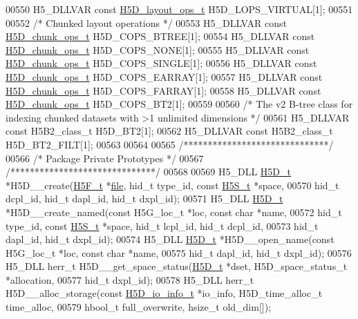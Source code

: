 \begin{DoxyCode}
00550 H5\_DLLVAR \textcolor{keyword}{const} \hyperlink{struct_h5_d__layout__ops__t}{H5D\_layout\_ops\_t} H5D\_LOPS\_VIRTUAL[1];
00551 
00552 \textcolor{comment}{/* Chunked layout operations */}
00553 H5\_DLLVAR \textcolor{keyword}{const} \hyperlink{struct_h5_d__chunk__ops__t}{H5D\_chunk\_ops\_t} H5D\_COPS\_BTREE[1];
00554 H5\_DLLVAR \textcolor{keyword}{const} \hyperlink{struct_h5_d__chunk__ops__t}{H5D\_chunk\_ops\_t} H5D\_COPS\_NONE[1];
00555 H5\_DLLVAR \textcolor{keyword}{const} \hyperlink{struct_h5_d__chunk__ops__t}{H5D\_chunk\_ops\_t} H5D\_COPS\_SINGLE[1];
00556 H5\_DLLVAR \textcolor{keyword}{const} \hyperlink{struct_h5_d__chunk__ops__t}{H5D\_chunk\_ops\_t} H5D\_COPS\_EARRAY[1];
00557 H5\_DLLVAR \textcolor{keyword}{const} \hyperlink{struct_h5_d__chunk__ops__t}{H5D\_chunk\_ops\_t} H5D\_COPS\_FARRAY[1];
00558 H5\_DLLVAR \textcolor{keyword}{const} \hyperlink{struct_h5_d__chunk__ops__t}{H5D\_chunk\_ops\_t} H5D\_COPS\_BT2[1];
00559 
00560 \textcolor{comment}{/* The v2 B-tree class for indexing chunked datasets with >1 unlimited dimensions */}
00561 H5\_DLLVAR \textcolor{keyword}{const} H5B2\_class\_t H5D\_BT2[1];
00562 H5\_DLLVAR \textcolor{keyword}{const} H5B2\_class\_t H5D\_BT2\_FILT[1];
00563 
00564 
00565 \textcolor{comment}{/******************************/}
00566 \textcolor{comment}{/* Package Private Prototypes */}
00567 \textcolor{comment}{/******************************/}
00568 
00569 H5\_DLL \hyperlink{struct_h5_d__t}{H5D\_t} *H5D\_\_create(\hyperlink{struct_h5_f__t}{H5F\_t} *\hyperlink{structfile}{file}, hid\_t type\_id, \textcolor{keyword}{const} \hyperlink{struct_h5_s__t}{H5S\_t} *space,
00570     hid\_t dcpl\_id, hid\_t dapl\_id, hid\_t dxpl\_id);
00571 H5\_DLL \hyperlink{struct_h5_d__t}{H5D\_t} *H5D\_\_create\_named(\textcolor{keyword}{const} H5G\_loc\_t *loc, \textcolor{keyword}{const} \textcolor{keywordtype}{char} *name,
00572     hid\_t type\_id, \textcolor{keyword}{const} \hyperlink{struct_h5_s__t}{H5S\_t} *space, hid\_t lcpl\_id, hid\_t dcpl\_id,
00573     hid\_t dapl\_id, hid\_t dxpl\_id);
00574 H5\_DLL \hyperlink{struct_h5_d__t}{H5D\_t} *H5D\_\_open\_name(\textcolor{keyword}{const} H5G\_loc\_t *loc, \textcolor{keyword}{const} \textcolor{keywordtype}{char} *name,
00575     hid\_t dapl\_id, hid\_t dxpl\_id);
00576 H5\_DLL herr\_t H5D\_\_get\_space\_status(\hyperlink{struct_h5_d__t}{H5D\_t} *dset, H5D\_space\_status\_t *allocation,
00577     hid\_t dxpl\_id);
00578 H5\_DLL herr\_t H5D\_\_alloc\_storage(\textcolor{keyword}{const} \hyperlink{struct_h5_d__io__info__t}{H5D\_io\_info\_t} *io\_info, H5D\_time\_alloc\_t time\_alloc,
00579     hbool\_t full\_overwrite, hsize\_t old\_dim[]);

\end{DoxyCode}
